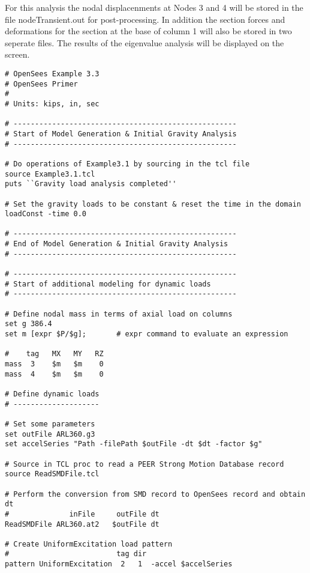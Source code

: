 \documentclass[12pt]{article}
\begin{document}
\vspace{0.2in} 

For this analysis the nodal displacenments at Nodes 3 and 4 will be stored in
the file nodeTransient.out for post-processing. In addition the
section forces and deformations for the section at the base of column
1 will also be stored in two seperate files.  The results of the
eigenvalue analysis will be displayed on the screen.

\vspace{0.2in} 

{\sf\small
\begin{verbatim}
# OpenSees Example 3.3
# OpenSees Primer
#
# Units: kips, in, sec

# ----------------------------------------------------
# Start of Model Generation & Initial Gravity Analysis
# ----------------------------------------------------

# Do operations of Example3.1 by sourcing in the tcl file
source Example3.1.tcl
puts ``Gravity load analysis completed''

# Set the gravity loads to be constant & reset the time in the domain
loadConst -time 0.0

# ----------------------------------------------------
# End of Model Generation & Initial Gravity Analysis
# ----------------------------------------------------

# ----------------------------------------------------
# Start of additional modeling for dynamic loads
# ----------------------------------------------------

# Define nodal mass in terms of axial load on columns
set g 386.4
set m [expr $P/$g];       # expr command to evaluate an expression

#    tag   MX   MY   RZ
mass  3    $m   $m    0
mass  4    $m   $m    0

# Define dynamic loads
# --------------------

# Set some parameters
set outFile ARL360.g3
set accelSeries "Path -filePath $outFile -dt $dt -factor $g"

# Source in TCL proc to read a PEER Strong Motion Database record
source ReadSMDFile.tcl

# Perform the conversion from SMD record to OpenSees record and obtain dt
#              inFile     outFile dt
ReadSMDFile ARL360.at2   $outFile dt

# Create UniformExcitation load pattern
#                         tag dir 
pattern UniformExcitation  2   1  -accel $accelSeries


\end{verbatim}}
\end{document}
